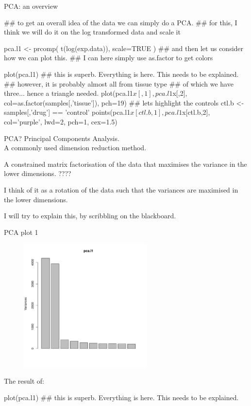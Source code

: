 \documentclass[pdf]{beamer}
\begin{document}
\begin{frame}[fragile]{PCA: an overview}
\begin{rcode}
  ## to get an overall idea of the data we can simply do a PCA.
  ## for this, I think we will do it on the log transformed data and scale it
  
  pca.l1 <- prcomp( t(log(exp.data)), scale=TRUE )
  ## and then let us consider how we can plot this.
  ## I can here simply use as.factor to get colors
  
  plot(pca.l1)  ## this is superb. Everything is here. This needs to be explained.
  ## however, it is probably almost all from tissue type
  ## of which we have three... hence a triangle needed.
  plot(pca.l1$x[,1], pca.l1$x[,2], col=as.factor(samples[,'tissue']), pch=19)
  ## lets highlight the controls
  ctl.b <- samples[,'drug'] == 'control'
  points(pca.l1$x[ctl.b,1], pca.l1$x[ctl.b,2], col='purple', lwd=2, pch=1, cex=1.5)
\end{rcode}
\end{frame}

\begin{frame}{PCA?}
  Principal Components Analysis.\\
  A commonly used dimension reduction method.

  A constrained matrix factorisation of the data that maximises the
  variance in the lower dimensions. ????

  I think of it as a rotation of the data such that the variances are
  maximised in the lower dimensions.

  I will try to explain this, by scribbling on the blackboard.
\end{frame}

\begin{frame}[fragile]{PCA plot 1}
  \begin{figure}[ht]
    \includegraphics[width=0.6\textwidth]{images/pca1}
  \end{figure}
  \vspace{-4em}
  The result of:
  \begin{rcode}
    plot(pca.l1)  ## this is superb. Everything is here. This needs to be explained.
  \end{rcode}
\end{frame}
\end{document}
